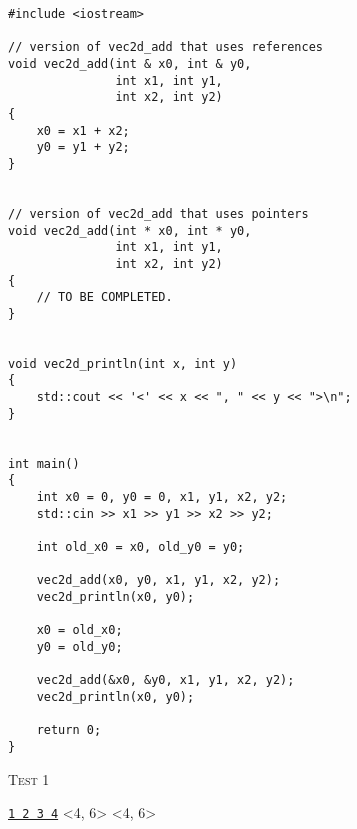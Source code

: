 \begin{Verbatim}[frame=single]
#include <iostream>

// version of vec2d_add that uses references
void vec2d_add(int & x0, int & y0, 
               int x1, int y1,
               int x2, int y2)
{
    x0 = x1 + x2;
    y0 = y1 + y2;
}


// version of vec2d_add that uses pointers
void vec2d_add(int * x0, int * y0, 
               int x1, int y1,
               int x2, int y2)
{
    // TO BE COMPLETED.
}


void vec2d_println(int x, int y)
{
    std::cout << '<' << x << ", " << y << ">\n";
}


int main()
{
    int x0 = 0, y0 = 0, x1, y1, x2, y2;
    std::cin >> x1 >> y1 >> x2 >> y2;

    int old_x0 = x0, old_y0 = y0;

    vec2d_add(x0, y0, x1, y1, x2, y2);
    vec2d_println(x0, y0);

    x0 = old_x0;
    y0 = old_y0;

    vec2d_add(&x0, &y0, x1, y1, x2, y2);
    vec2d_println(x0, y0);

    return 0;
}
\end{Verbatim}

\textsc{Test 1}
\begin{console}[commandchars=\\\{\}]
\underline{\texttt{1 2 3 4}}
<4, 6>
<4, 6>
\end{console}
